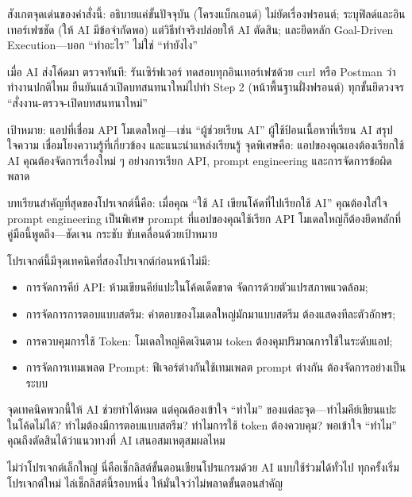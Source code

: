 สังเกตจุดเด่นของคำสั่งนี้: อธิบายแค่ขั้นปัจจุบัน (โครงแบ็กเอนด์) ไม่ยัดเรื่องฟรอนต์; ระบุฟิลด์และอินเทอร์เฟซชัด (ให้ AI มีข้อจำกัดพอ) แต่วิธีทำจริงปล่อยให้ AI ตัดสิน; และยึดหลัก Goal-Driven Execution—บอก “ทำอะไร” ไม่ใช่ “ทำยังไง”

เมื่อ AI ส่งโค้ดมา ตรวจทันที: รันเซิร์ฟเวอร์ ทดสอบทุกอินเทอร์เฟซด้วย curl หรือ Postman ว่าทำงานปกติไหม ยืนยันแล้วเปิดบทสนทนาใหม่ไปทำ Step 2 (หน้าพื้นฐานฝั่งฟรอนต์) ทุกขั้นยึดวงจร “สั่งงาน-ตรวจ-เปิดบทสนทนาใหม่”



เป้าหมาย: แอปที่เชื่อม API โมเดลใหญ่—เช่น “ผู้ช่วยเรียน AI” ผู้ใช้ป้อนเนื้อหาที่เรียน AI สรุปใจความ เชื่อมโยงความรู้ที่เกี่ยวข้อง และแนะนำแหล่งเรียนรู้ จุดพิเศษคือ: แอปของคุณเองต้องเรียกใช้ AI คุณต้องจัดการเรื่องใหม่ ๆ อย่างการเรียก API, prompt engineering และการจัดการข้อผิดพลาด

บทเรียนสำคัญที่สุดของโปรเจกต์นี้คือ: เมื่อคุณ “ใช้ AI เขียนโค้ดที่ไปเรียกใช้ AI” คุณต้องใส่ใจ prompt engineering เป็นพิเศษ prompt ที่แอปของคุณใช้เรียก API โมเดลใหญ่ก็ต้องยึดหลักที่คู่มือนี้พูดถึง—ชัดเจน กระชับ ขับเคลื่อนด้วยเป้าหมาย


โปรเจกต์นี้มีจุดเทคนิคที่สองโปรเจกต์ก่อนหน้าไม่มี:

\begin{itemize}
  \item การจัดการคีย์ API: ห้ามเขียนคีย์แปะในโค้ดเด็ดขาด จัดการด้วยตัวแปรสภาพแวดล้อม;
  \item การจัดการการตอบแบบสตรีม: คำตอบของโมเดลใหญ่มักมาแบบสตรีม ต้องแสดงทีละตัวอักษร;
  \item การควบคุมการใช้ Token: โมเดลใหญ่คิดเงินตาม token ต้องคุมปริมาณการใช้ในระดับแอป;
  \item การจัดการเทมเพลต Prompt: ฟีเจอร์ต่างกันใช้เทมเพลต prompt ต่างกัน ต้องจัดการอย่างเป็นระบบ
\end{itemize}

จุดเทคนิคพวกนี้ให้ AI ช่วยทำได้หมด แต่คุณต้องเข้าใจ “ทำไม” ของแต่ละจุด—ทำไมคีย์เขียนแปะในโค้ดไม่ได้? ทำไมต้องมีการตอบแบบสตรีม? ทำไมการใช้ token ต้องควบคุม? พอเข้าใจ “ทำไม” คุณถึงตัดสินได้ว่าแนวทางที่ AI เสนอสมเหตุสมผลไหม


ไม่ว่าโปรเจกต์เล็กใหญ่ นี่คือเช็กลิสต์ขั้นตอนเขียนโปรแกรมด้วย AI แบบใช้ร่วมได้ทั่วไป ทุกครั้งเริ่มโปรเจกต์ใหม่ ไล่เช็กลิสต์นี้รอบหนึ่ง ให้มั่นใจว่าไม่พลาดขั้นตอนสำคัญ

